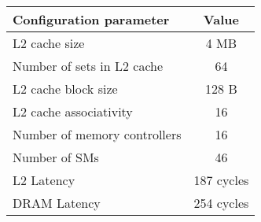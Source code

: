 \begin{tabular}{|l|c|}
    \hline
    \textbf{Configuration parameter} & \textbf{Value} \\
    \hline
    \hline
    L2 cache size & 4 MB \\
    Number of sets in L2 cache & 64 \\
    L2 cache block size & 128 B \\
    L2 cache associativity & 16 \\
    Number of memory controllers & 16 \\
    Number of SMs & 46 \\
    L2 Latency & 187 cycles \\
    DRAM Latency & 254 cycles \\
    \hline
\end{tabular}